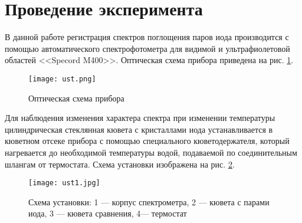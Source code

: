 \section{Проведение эксперимента}
В данной работе регистрация спектров поглощения паров иода производится с помощью автоматического спектрофотометра для видимой и ультрафиолетовой областей <<Specord M400>>. Оптическая схема прибора приведена на рис. \ref{fig:ust}.

\begin{figure}[h!]
\centering
\texttt{[image: ust.png]}
\caption{Оптическая схема прибора}
\label{fig:ust}
\end{figure}

Для наблюдения изменения характера спектра при изменении температуры цилиндрическая стеклянная кювета с кристаллами иода устанавливается в кюветном отсеке прибора с помощью специального кюветодержателя, который нагревается до необходимой температуры водой, подаваемой по соединительным шлангам от термостата. Схема установки изображена на рис. \ref{fig:ust1}.

\begin{figure}[h!]
	\centering
	\texttt{[image: ust1.jpg]}
	\caption{Схема установки: 1 --- корпус спектрометра, 2 --- кювета с парами иода, 3 --- кювета сравнения, 4--- термостат}
	\label{fig:ust1}
\end{figure}

